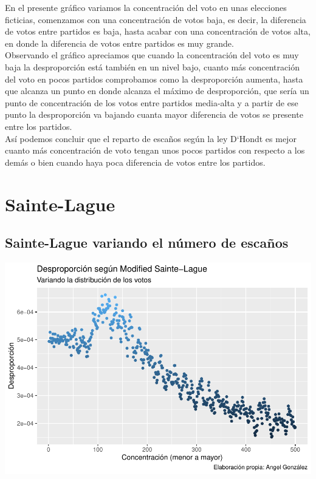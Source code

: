 \documentclass[12pt,a4paper,]{book}
\numberwithin{dummy}{section}
\theoremstyle{ocrenumbox}
\theoremstyle{blacknumex}
\theoremstyle{blacknumbox}
\theoremstyle{ocrenum}
\theoremstyle{ocrenum}
\begin{document}
En el presente gráfico variamos la concentración del voto en unas
elecciones ficticias, comenzamos con una concentración de votos baja, es
decir, la diferencia de votos entre partidos es baja, hasta acabar con
una concentración de votos alta, en donde la diferencia de votos entre
partidos es muy grande.\\
Observando el gráfico apreciamos que cuando la concentración del voto es
muy baja la desproporción está también en un nivel bajo, cuanto más
concentración del voto en pocos partidos comprobamos como la
desproporción aumenta, hasta que alcanza un punto en donde alcanza el
máximo de desproporción, que sería un punto de concentración de los
votos entre partidos media-alta y a partir de ese punto la desproporción
va bajando cuanta mayor diferencia de votos se presente entre los
partidos.\\
Así podemos concluir que el reparto de escaños según la ley D`Hondt es
mejor cuanto más concentración de voto tengan unos pocos partidos con
respecto a los demás o bien cuando haya poca diferencia de votos entre
los partidos.

\hypertarget{sainte-lague}{%
\section{Sainte-Lague}\label{sainte-lague}}

\hypertarget{sainte-lague-variando-el-nuxfamero-de-escauxf1os}{%
\subsection{Sainte-Lague variando el número de
escaños}\label{sainte-lague-variando-el-nuxfamero-de-escauxf1os}}

\begin{center}\includegraphics[width=0.95\linewidth]{figurasR/unnamed-chunk-18-1} \end{center}
\end{document}
